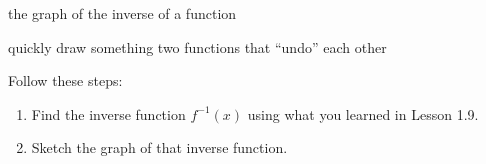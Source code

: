 \documentclass[fleqn,letterpaper,12pt,printwatermark=false]{memoir}
\begin{document}
\newcommand{\myClassName}{Pre-AP Algebra 2}
\newcommand{\myUnitNumber}{1}
\newcommand{\myUnitTitle}{Introduction to Functions}
\newcommand{\myLessonNumber}{10}
\newcommand{\myLessonTitle}{Sketching Inverses}



\pagestyle{myPagestyle}

\checkandfixthelayout
{}

\begin{myNotesHeader}
    \item {} the graph of the inverse of a function
\end{myNotesHeader}

\begin{myVocabulary}
        {
            quickly draw something
        }
        {
            two functions that ``undo'' each other
        }
\end{myVocabulary}

\begin{myKeyConcepts}
    Follow these steps:
    \begin{enumerate}
        \item Find the inverse function $f^{-1}(x)$ using what you learned in Lesson 1.9.
        \item Sketch the graph of that inverse function.
    \end{enumerate}
\end{myKeyConcepts}



  
\end{document}

